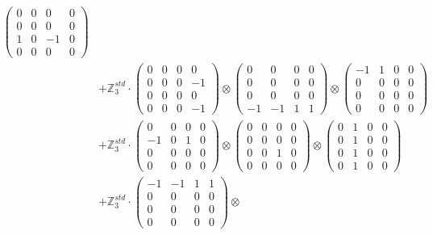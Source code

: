 \documentclass{article}
\begin{document}
{\begin{align}
            \begin{pmatrix} 0 & 0 & 0 & 0 \\ 0 & 0 & 0 & 0 \\ 1 & 0 & -1 & 0 \\ 0 & 0 & 0 & 0 \end{pmatrix} \\ 
        &+ \label{Rs1-Rc16-Solution-5-c15} \mathbb{Z}_3^{std} \cdot 
            \begin{pmatrix} 0 & 0 & 0 & 0 \\ 0 & 0 & 0 & -1 \\ 0 & 0 & 0 & 0 \\ 0 & 0 & 0 & -1 \end{pmatrix} \otimes 
            \begin{pmatrix} 0 & 0 & 0 & 0 \\ 0 & 0 & 0 & 0 \\ 0 & 0 & 0 & 0 \\ -1 & -1 & 1 & 1 \end{pmatrix} \otimes 
            \begin{pmatrix} -1 & 1 & 0 & 0 \\ 0 & 0 & 0 & 0 \\ 0 & 0 & 0 & 0 \\ 0 & 0 & 0 & 0 \end{pmatrix} \\ 
        &+ \label{Rs1-Rc16-Solution-5-c16} \mathbb{Z}_3^{std} \cdot 
            \begin{pmatrix} 0 & 0 & 0 & 0 \\ -1 & 0 & 1 & 0 \\ 0 & 0 & 0 & 0 \\ 0 & 0 & 0 & 0 \end{pmatrix} \otimes 
            \begin{pmatrix} 0 & 0 & 0 & 0 \\ 0 & 0 & 0 & 0 \\ 0 & 0 & 1 & 0 \\ 0 & 0 & 0 & 0 \end{pmatrix} \otimes 
            \begin{pmatrix} 0 & 1 & 0 & 0 \\ 0 & 1 & 0 & 0 \\ 0 & 1 & 0 & 0 \\ 0 & 1 & 0 & 0 \end{pmatrix} \\ 
        &+ \label{Rs1-Rc16-Solution-5-c17} \mathbb{Z}_3^{std} \cdot 
            \begin{pmatrix} -1 & -1 & 1 & 1 \\ 0 & 0 & 0 & 0 \\ 0 & 0 & 0 & 0 \\ 0 & 0 & 0 & 0 \end{pmatrix} \otimes 

\end{align}}
\end{document}
